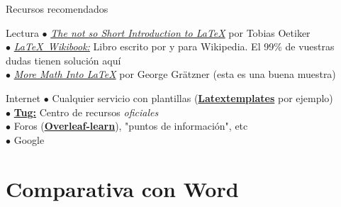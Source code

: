 \documentclass[12pt]{beamer}
\begin{document}
\begin{frame}{Recursos recomendados}
\begin{block}{Lectura}
	$\bullet$ \href{https://tobi.oetiker.ch/lshort/lshort.pdf}{\textit{The not so Short Introduction to \LaTeX}} por Tobias Oetiker \\
	$\bullet$ \href{https://en.wikibooks.org/wiki/LaTeX}{\textit{\LaTeX\ Wikibook:}} Libro escrito por y para Wikipedia. El 99\% de vuestras dudas tienen solución aquí \\
	$\bullet$ \href{http://osl.ugr.es/CTAN/info/Math_into_LaTeX-4/Short_Course.pdf}{\textit{More Math Into \LaTeX}} por George Grätzner (esta es una buena muestra)
\end{block}
\begin{block}{Internet}
	$\bullet$ Cualquier servicio con plantillas (\href{http://www.latextemplates.com/}{\textbf{Latextemplates}} por ejemplo) \\
	$\bullet$ \href{https://www.tug.org/begin.html}{\textbf{Tug:}} Centro de recursos \textit{oficiales} \\
	$\bullet$ Foros (\href{https://www.overleaf.com/learn}{\underline{\textbf{Overleaf-learn}}}), "puntos de información", etc \\
	$\bullet$ Google
\end{block}

\end{frame}

\section{Comparativa con Word}
\end{document}
